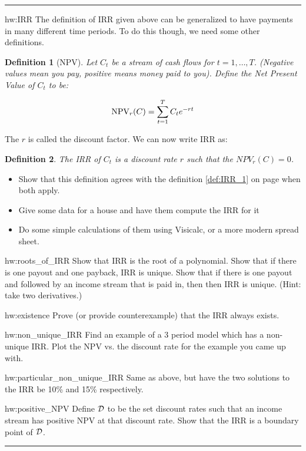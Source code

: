 \documentclass{book}
\newtheorem{definition}{Definition}[chapter]
\newenvironment{textHW}{
  \noindent\rule{\textwidth}{1pt}%
  \begin{list}{}{
      \setlength{\labelwidth}{1cm}
      \setlength{\labelsep}{0.3cm}
      \setlength{\leftmargin}{1.3cm}
      \setlength{\rightmargin}{1cm}
      \setlength{\parsep}{0.5ex plus0.2ex minus0.1ex}
      \setlength{\topsep}{1pt plus3pt minus1pt}
      \setlength{\itemsep}{0ex plus0.2ex} 
      \renewcommand{\makelabel}[1]{\label{thw:##1}{\ref{##1}}}
      \sl}}%
  {\end{list}\rule{\textwidth}{1pt}}
\newcommand{\notes}{\index{personal notes}}
\begin{document}
\begin{textHW}
\item[hw:IRR] The definition of IRR given above can be generalized to
  have payments in many different time periods.  To do this though, we
  need some other definitions.

  \begin{definition}[NPV] \label{def:NPV} Let $C_t$ be a stream of cash
    flows for $t=1,\ldots,T$.  (Negative values mean you pay, positive
    means money paid to you).  Define the Net Present Value of $C_t$
    to be:

    \begin{displaymath}
      \hbox{NPV}_r(C) = \sum_{t=1}^{T} C_t e^{-rt}
    \end{displaymath}
  \end{definition}

  The $r$ is called the discount factor.  We can now write IRR as:
  
  \begin{definition}  \label{def:IRR} The IRR of $C_t$ is a discount
    rate $r$ such that the $NPV_r(C) = 0$.
  \end{definition}
  \begin{itemize}
  \item Show that this definition agrees with the definition
    \ref{def:IRR_1} on page \pageref{def:IRR_1} when both apply.
  \item {\sloppy \notes Give some data for a house and have them compute
      the IRR for it}
  \item Do some simple calculations of them using Visicalc, or a more
    modern spread sheet.

  \end{itemize}

\item[hw:roots_of_IRR] Show that IRR is the root of a polynomial.
  Show that if there is one payout and one payback, IRR is
  unique. Show that if there is one payout and followed by an income
  stream that is paid in, then then IRR is unique. (Hint: take two
  derivatives.)
\item[hw:existence] Prove (or provide counterexample) that the IRR always
  exists.
\item[hw:non_unique_IRR] Find an example of a 3 period model which has a
  non-unique IRR.  Plot the NPV vs. the discount rate for the example
  you came up with.
\item[hw:particular_non_unique_IRR] Same as above, but have the two
  solutions to the IRR be 10\% and 15\% respectively.
\item[hw:positive_NPV] Define ${\cal D}$ to be the set discount rates
  such that an income stream has positive NPV at that discount rate.
  Show that the IRR is a boundary point of ${\cal D}$.
\end{textHW}
\end{document}
